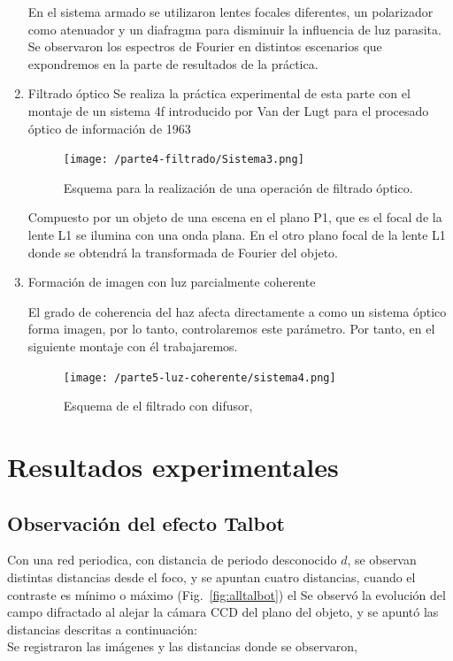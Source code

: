 \documentclass{./packages/optica-article}
\begin{document}
\begin{enumerate}
En el sistema armado se utilizaron lentes focales diferentes, un polarizador como atenuador y un diafragma para disminuir la influencia de luz parasita.\\
Se observaron los espectros de Fourier en distintos escenarios que expondremos en la parte de resultados de la práctica.
    \item Filtrado óptico
Se realiza la práctica experimental de esta parte con el montaje de un sistema 4f introducido por Van der Lugt para el procesado óptico de información de 1963

\begin{figure}[h]
    \centering
    \texttt{[image: /parte4-filtrado/Sistema3.png]}
    \caption{Esquema para la realización de una operación de filtrado óptico.}
    \label{filtradoopticosistema}
    \end{figure}
    
Compuesto por un objeto de una escena en el plano P1, que es el focal de la lente L1 se ilumina con una onda plana. En el otro plano focal de la lente L1 donde se obtendrá la transformada de Fourier del objeto.

    \item Formación de imagen con luz parcialmente coherente

El grado de coherencia del haz afecta directamente a como un sistema óptico forma imagen, por lo tanto, controlaremos este parámetro. Por tanto, en el siguiente montaje con él trabajaremos.

\begin{figure}[h]
    \centering
    \texttt{[image: /parte5-luz-coherente/sistema4.png]}
    \caption{Esquema de el filtrado con difusor, }
    \label{coherenciaespacial}
    \end{figure}

\end{enumerate}

\section{Resultados experimentales}

\subsection{Observación del efecto Talbot}
Con una red periodica, con distancia de periodo desconocido $d$, se observan  distintas distancias desde el foco, y se apuntan cuatro distancias, cuando el contraste es mínimo o máximo (Fig.~\ref{fig:alltalbot}) el Se observó la evolución del campo difractado al alejar la cámara CCD del plano del objeto, y se apuntó las distancias descritas a continuación:\\
Se registraron las imágenes y las distancias donde se observaron, 
\end{document}
